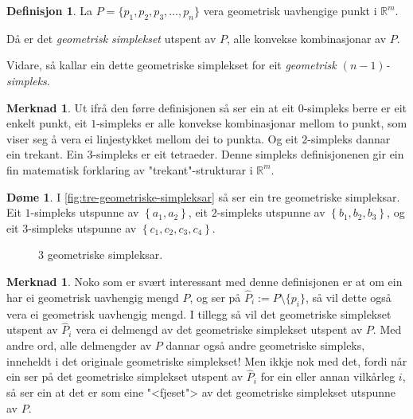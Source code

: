 \documentclass[a4paper, 12pt, norsk]{article}
\theoremstyle{plain}
\theoremstyle{definition}
\newtheorem{definition}[theorem]{Definisjon}
\newtheorem{example}[theorem]{Døme}
\newtheorem{remark}[theorem]{Merknad}
\newcommand{\Rb}{\mathbb{R}}
\newcommand{\set}[1]{ \left\{ #1 \right\} } %
\begin{document}
\begin{definition}
	La $P=\{p_1, p_2, p_3, \dots, p_n\}$ vera geometrisk uavhengige punkt i $\Rb^m$.

	Då er det \emph{geometrisk simplekset} utspent av \( P \), alle konvekse kombinasjonar av $P$.
	
	Vidare, så kallar ein dette geometriske simplekset for eit \emph{geometrisk $(n-1)$-simpleks}.
\end{definition}

\begin{remark}
	Ut ifrå den førre definisjonen så ser ein at eit $0$-simpleks berre er eit enkelt punkt, eit $1$-simpleks er alle konvekse kombinasjonar mellom to punkt, som viser seg å vera ei linjestykket mellom dei to punkta. Og eit $2$-simpleks dannar ein trekant. Ein $3$-simpleks er eit tetraeder. Denne simpleks definisjonenen gir ein fin matematisk forklaring av "trekant"-strukturar i $\Rb^m$.
\end{remark}

\begin{example}
	 I \autoref{fig:tre-geometriske-simpleksar} så ser ein tre geometriske simpleksar. Eit \( 1 \)-simpleks utspunne av \( \set{a_1, a_2} \), eit \(2\)-simpleks utspunne av \( \set{b_1, b_2, b_3} \), og eit \(3\)-simpleks utspunne av \( \set{c_1, c_2, c_3, c_4} \).
	\begin{figure}[htbp]
		\begin{center}
			
			\caption{3 geometriske simpleksar.}
			\label{fig:tre-geometriske-simpleksar}
		\end{center}
	\end{figure}
\end{example}

\begin{remark}
	Noko som er svært interessant med denne definisjonen er at om ein har ei geometrisk uavhengig mengd $P$, og ser på $\hat{P}_i := P \setminus \{p_i\}$, så vil dette også vera ei geometrisk uavhengig mengd. I tillegg så vil det geometriske simplekset utspent av $\hat{P}_i$ vera ei delmengd av det geometriske simplekset utspent av $P$. Med andre ord, alle delmengder av $P$ dannar også andre geometriske simpleks, inneheldt i det originale geometriske simplekset! Men ikkje nok med det, fordi når ein ser på det geometriske simplekset utspent av $\hat{P}_i$ for ein eller annan vilkårleg $i$, så ser ein at det er som eine "<fjeset"> av det geometriske simplekset utspunne av $P$. 
\end{remark} %
\end{document}
